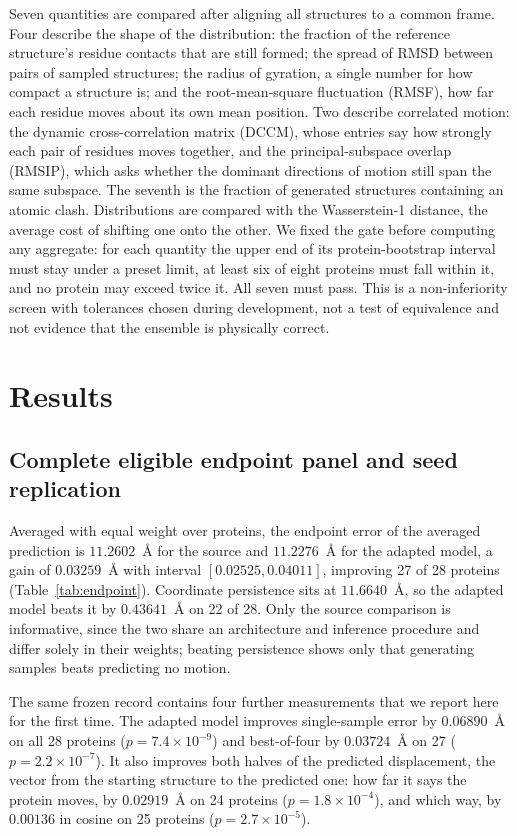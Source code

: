 \documentclass{article}
\begin{document}
Seven quantities are compared after aligning all structures to a common frame. Four describe the shape of the distribution: the fraction of the reference structure's residue contacts that are still formed; the spread of RMSD between pairs of sampled structures; the radius of gyration, a single number for how compact a structure is; and the root-mean-square fluctuation (RMSF), how far each residue moves about its own mean position. Two describe correlated motion: the dynamic cross-correlation matrix (DCCM), whose entries say how strongly each pair of residues moves together, and the principal-subspace overlap (RMSIP), which asks whether the dominant directions of motion still span the same subspace. The seventh is the fraction of generated structures containing an atomic clash. Distributions are compared with the Wasserstein-1 distance, the average cost of shifting one onto the other. We fixed the gate before computing any aggregate: for each quantity the upper end of its protein-bootstrap interval must stay under a preset limit, at least six of eight proteins must fall within it, and no protein may exceed twice it. All seven must pass. This is a non-inferiority screen with tolerances chosen during development, not a test of equivalence and not evidence that the ensemble is physically correct.

\section{Results}

\subsection{Complete eligible endpoint panel and seed replication}

Averaged with equal weight over proteins, the endpoint error of the averaged prediction is $11.2602$~\AA{} for the source and $11.2276$~\AA{} for the adapted model, a gain of $0.03259$~\AA{} with interval $[0.02525, 0.04011]$, improving 27 of 28 proteins (Table~\ref{tab:endpoint}). Coordinate persistence sits at $11.6640$~\AA{}, so the adapted model beats it by $0.43641$~\AA{} on 22 of 28. Only the source comparison is informative, since the two share an architecture and inference procedure and differ solely in their weights; beating persistence shows only that generating samples beats predicting no motion.

The same frozen record contains four further measurements that we report here for the first time. The adapted model improves single-sample error by $0.06890$~\AA{} on all 28 proteins ($p=7.4\times10^{-9}$) and best-of-four by $0.03724$~\AA{} on 27 ($p=2.2\times10^{-7}$). It also improves both halves of the predicted displacement, the vector from the starting structure to the predicted one: how far it says the protein moves, by $0.02919$~\AA{} on 24 proteins ($p=1.8\times10^{-4}$), and which way, by $0.00136$ in cosine on 25 proteins ($p=2.7\times10^{-5}$).
\end{document}
